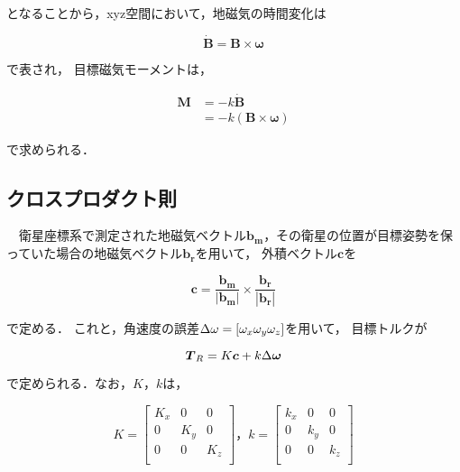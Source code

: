 となることから，xyz空間において，地磁気の時間変化は

\begin{equation}
    \boldsymbol{\dot{B} = B \times \omega}
\end{equation}

で表され，
目標磁気モーメントは，

\begin{equation}
    \begin{aligned}
        \boldsymbol{M} &= -k \boldsymbol{\dot{B}}\\
                       &= -k(\boldsymbol{B \times \omega})
    \end{aligned}
\end{equation}

で求められる．

\subsection{クロスプロダクト則}
　衛星座標系で測定された地磁気ベクトル$\boldsymbol{b_m}$，その衛星の位置が目標姿勢を保っていた場合の地磁気ベクトル$\boldsymbol{b_r}$を用いて，
外積ベクトル$\boldsymbol{c}$を

\begin{equation}
    \boldsymbol{c} = \boldsymbol{\frac{b_m}{|b_m|}\times\frac{b_r}{|b_r|}}
\end{equation}

で定める．
これと，角速度の誤差$\Delta\omega = [\omega_x\space\omega_y\space\omega_z]$を用いて，
目標トルクが

\begin{equation}
    \boldsymbol{T}_R = K\boldsymbol{c}+k\Delta\boldsymbol{\omega}\\
\end{equation}

で定められる．なお，$K，k$は，

\begin{equation}
    K = 
    \begin{bmatrix}
        K_x & 0 & 0 \\
        0 & K_y & 0 \\
        0 & 0 & K_z \\
    \end{bmatrix}
    ，k =
    \begin{bmatrix}
        k_x & 0 & 0 \\
        0 & k_y & 0 \\
        0 & 0 & k_z \\
    \end{bmatrix}
\end{equation}

